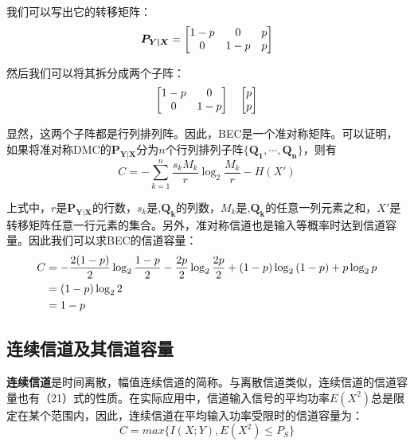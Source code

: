 \documentclass[UTF8,a4paper,11pt]{article}
\begin{document}
我们可以写出它的转移矩阵：
\begin{equation}
\notag
\bm{P_{Y|X}}=
\begin{bmatrix}
1-p&0&p\\
0&1-p&p\\
\end{bmatrix}
\end{equation}

然后我们可以将其拆分成两个子阵：
\begin{equation}
\notag
\begin{bmatrix}
1-p&0\\
0&1-p\\
\end{bmatrix}
\quad
\begin{bmatrix}
p\\
p\\
\end{bmatrix}
\end{equation}

显然，这两个子阵都是行列排列阵。因此，BEC是一个准对称矩阵。可以证明，如果将准对称DMC的$\bm{P_{Y|X}}$分为$n$个行列排列子阵$\{\bm{Q_1},\cdots,\bm{Q_n}\}$，则有
\begin{equation}
C=-\sum_{k=1}^n\frac{s_kM_k}{r}\log_{2}{\frac{M_k}{r}}-H(X')
\end{equation}

上式中，$r$是$\bm{P_{Y|X}}$的行数，$s_k$是,$\bm{Q_k}$的列数，$M_k$是,$\bm{Q_k}$的任意一列元素之和，$X'$是转移矩阵任意一行元素的集合。另外，准对称信道也是输入等概率时达到信道容量。因此我们可以求BEC的信道容量：
\begin{equation}
\notag
\begin{aligned}
C&=-\frac{2(1-p)}{2}\log_{2}{\frac{1-p}{2}}-\frac{2p}{2}\log_{2}{\frac{2p}{2}}+(1-p)\log_{2}{(1-p)}+p\log_{2}{p}\\
&=(1-p)\log_{2}{2}\\
&=1-p
\end{aligned}
\end{equation}

\subsection{连续信道及其信道容量}
\textbf{连续信道}是时间离散，幅值连续信道的简称。与离散信道类似，连续信道的信道容量也有（21）式的性质。在实际应用中，信道输入信号的平均功率$E(X^2)$总是限定在某个范围内，因此，连续信道在平均输入功率受限时的信道容量为：
\begin{equation}
C=max\{I(X;Y),E(X^2)\le P_S\}
\end{equation}
\end{document}
